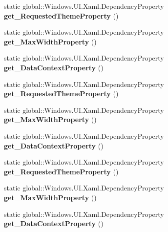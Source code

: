 \begin{DoxyCompactItemize}
static global\+::\+Windows.\+U\+I.\+Xaml.\+Dependency\+Property {\bfseries get\+\_\+\+Requested\+Theme\+Property} ()
\item 
\mbox{\label{class_windows_1_1_u_i_1_1_xaml_1_1_framework_element_a7fe775b9e8b34c40bd7c3afc25f6fffb}} 
static global\+::\+Windows.\+U\+I.\+Xaml.\+Dependency\+Property {\bfseries get\+\_\+\+Max\+Width\+Property} ()
\item 
\mbox{\label{class_windows_1_1_u_i_1_1_xaml_1_1_framework_element_aa09001679b9cf376aa35ed86d7d75afd}} 
static global\+::\+Windows.\+U\+I.\+Xaml.\+Dependency\+Property {\bfseries get\+\_\+\+Data\+Context\+Property} ()
\item 
\mbox{\label{class_windows_1_1_u_i_1_1_xaml_1_1_framework_element_a3cdfe2f1cb8b9bedf69d8c72e8fb8773}} 
static global\+::\+Windows.\+U\+I.\+Xaml.\+Dependency\+Property {\bfseries get\+\_\+\+Requested\+Theme\+Property} ()
\item 
\mbox{\label{class_windows_1_1_u_i_1_1_xaml_1_1_framework_element_a7fe775b9e8b34c40bd7c3afc25f6fffb}} 
static global\+::\+Windows.\+U\+I.\+Xaml.\+Dependency\+Property {\bfseries get\+\_\+\+Max\+Width\+Property} ()
\item 
\mbox{\label{class_windows_1_1_u_i_1_1_xaml_1_1_framework_element_aa09001679b9cf376aa35ed86d7d75afd}} 
static global\+::\+Windows.\+U\+I.\+Xaml.\+Dependency\+Property {\bfseries get\+\_\+\+Data\+Context\+Property} ()
\item 
\mbox{\label{class_windows_1_1_u_i_1_1_xaml_1_1_framework_element_a3cdfe2f1cb8b9bedf69d8c72e8fb8773}} 
static global\+::\+Windows.\+U\+I.\+Xaml.\+Dependency\+Property {\bfseries get\+\_\+\+Requested\+Theme\+Property} ()
\item 
\mbox{\label{class_windows_1_1_u_i_1_1_xaml_1_1_framework_element_a7fe775b9e8b34c40bd7c3afc25f6fffb}} 
static global\+::\+Windows.\+U\+I.\+Xaml.\+Dependency\+Property {\bfseries get\+\_\+\+Max\+Width\+Property} ()
\item 
\mbox{\label{class_windows_1_1_u_i_1_1_xaml_1_1_framework_element_aa09001679b9cf376aa35ed86d7d75afd}} 
static global\+::\+Windows.\+U\+I.\+Xaml.\+Dependency\+Property {\bfseries get\+\_\+\+Data\+Context\+Property} ()
\end{DoxyCompactItemize}
